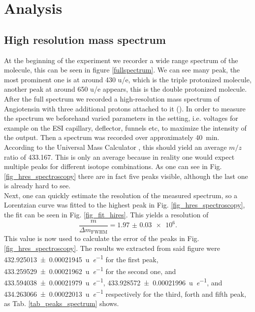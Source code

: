 \documentclass[a4paper,10pt]{article}
\begin{document}
\section{Analysis}

\subsection{High resolution mass spectrum}
At the beginning of the experiment we recorder a wide range spectrum of the molecule, this can be seen in figure \ref{fullspectrum}. We can see many peak, the most prominent one is at around 430 u/e, which is the triple protonized molecule, another peak at around 650 u/e appears, this is the double protonized molecule. After the full spectrum we recorded a high-resolution mass spectrum of Angiotensin with three additional protons attached to it (). In order to measure the spectrum we beforehand varied parameters in the setting, i.e. voltages for example on the ESI capillary, deflector, funnels etc, to maximize the intensity of the output.
Then a spectrum was recorded over approximately \SI{40}{\minute}.\\
According to the Universal Mass Calculator \cite{umc}, this should yield an average $m/z$ ratio of \num{433.167}. This is only an average because in reality one would expect multiple peaks for different isotope combinations. As one can see in Fig. \ref{fig_hres_spectroscopy} there are in fact five peaks visible, although the last one is already hard to see. \\
Next, one can quickly estimate the resolution of the measured spectrum, so a Lorentzian curve was fitted to the highest peak in Fig. \ref{fig_hres_spectroscopy}, the fit can be seen in Fig. \ref{fig_fit_hires}. This yields a resolution of
\begin{equation}
	\frac{m}{\Delta m_\mathrm{FWHM}} = \num{1.97(3) e6}.
\end{equation}
This value is now used to calculate the error of the peaks in Fig. \ref{fig_hres_spectroscopy}. The results we extracted from said figure were \SI{432.925013 \pm 0.00021945}{\atomicmassunit \per \elementarycharge} for the first peak, \SI{433.259529 \pm 0.00021962}{\atomicmassunit \per \elementarycharge} for the second one, and \SI{433.594038 \pm 0.00021979}{\atomicmassunit \per \elementarycharge}, \SI{433.928572 \pm 0.00021996}{\atomicmassunit \per \elementarycharge}, and \SI{434.263066 \pm 0.00022013}{\atomicmassunit \per \elementarycharge} respectively for the third, forth and fifth peak, as Tab. \ref{tab_peaks_spectrum} shows.
\end{document}
